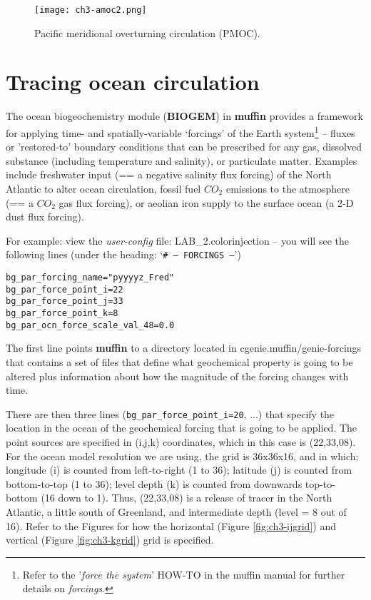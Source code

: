 \begin{figure}
\texttt{[image: ch3-amoc2.png]}\centering
\vspace{-0mm}
\caption{Pacific meridional overturning circulation (PMOC).}
\label{fig:ch3-amoc2}
\end{figure}

\newpage

\section{Tracing ocean circulation}

The ocean biogeochemistry module (\textbf{BIOGEM}) in \textbf{muffin} provides a framework for applying time- and spatially-variable ‘forcings’ of the Earth system\footnote{Refer to the '\textit{force the system}' \textsf{HOW-TO} in the muffin manual for further details on \textit{forcings}.} – fluxes or 'restored-to' boundary conditions that can be prescribed for any gas, dissolved substance (including temperature and salinity), or particulate matter. Examples include freshwater input (== a negative salinity flux forcing) of the North Atlantic to alter ocean circulation, fossil fuel \(CO_{2}\) emissions to the atmosphere (== a \(CO_{2}\) gas flux forcing), or aeolian iron supply to the surface ocean (a 2-D dust flux forcing).

\vspace{1mm}
For example: view the \textit{user-config} file: \textsf{\footnotesize LAB\_2.colorinjection} – you will see the following lines (under the heading: ‘\texttt{\# --- FORCINGS ---}’)

\vspace{-2mm}\small
\begin{verbatim}
bg_par_forcing_name="pyyyyz_Fred"
bg_par_force_point_i=22
bg_par_force_point_j=33
bg_par_force_point_k=8
bg_par_ocn_force_scale_val_48=0.0
\end{verbatim}
\normalsize\vspace{-2mm}

The first line points \textbf{muffin} to a directory located in \textsf{\footnotesize cgenie.muffin/genie-forcings} that contains a set of files that define what geochemical property is going to be altered plus information about how the magnitude of the forcing changes with time.

There are then three lines (\texttt{bg\_par\_force\_point\_i=20}, ...) that specify the location in the ocean of the geochemical forcing that is going to be applied. The point sources are specified in (i,j,k) coordinates, which in this case is (22,33,08). For the ocean model resolution we are using, the grid is 36x36x16, and in which: longitude (i) is counted from left-to-right (1 to 36); latitude (j) is counted from bottom-to-top (1 to 36); level depth (k) is counted from downwards top-to-bottom (16 down to 1). Thus, (22,33,08) is a release of tracer in the North Atlantic, a little south of Greenland, and intermediate depth (level = 8 out of 16). Refer to the Figures for how the horizontal (Figure \ref{fig:ch3-ijgrid}) and vertical (Figure \ref{fig:ch3-kgrid}) grid is specified.

